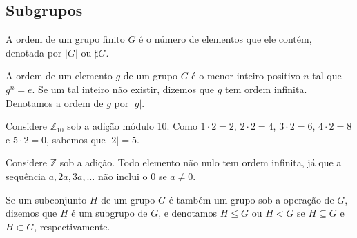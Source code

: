 \subsection*{Subgrupos}
%
\begin{definition}
\label{def-ordem-grupo}
    A ordem de um grupo finito $G$ é o número de elementos que ele contém, denotada por
    $|G|$ ou $\sharp G$.
\end{definition}
%
\begin{definition}
\label{def-ordem-elemento}
    A ordem de um elemento $g$ de um grupo $G$ é o menor inteiro positivo $n$ tal que
    $g^n = e$. Se um tal inteiro não existir, dizemos que $g$ tem ordem infinita. Denotamos
    a ordem de $g$ por $|g|$.
\end{definition}
%
\begin{example}
    Considere $\mathbb{Z}_{10}$ sob a adição módulo 10. Como $1\cdot 2 = 2$, $2\cdot 2 = 4$,
    $3\cdot 2 = 6$, $4\cdot 2 = 8$ e $5\cdot 2 = 0$, sabemos que $|2| = 5$.
\end{example}
%
\begin{example}
    Considere $\mathbb{Z}$ sob a adição. Todo elemento não nulo tem ordem infinita, já que a
    sequência $a, 2a, 3a, \dots$ não inclui o 0 se $a\neq 0$.
\end{example}
%
\begin{definition}[Subgrupo]
\label{def-subgrupo}
    Se um subconjunto $H$ de um grupo $G$ é também um grupo sob a operação de $G$,
    dizemos que $H$ é um subgrupo de $G$, e denotamos $H \leq G$ ou $H < G$ se $H\subseteq G$
    e $H \subset G$, respectivamente.
\end{definition}
%
